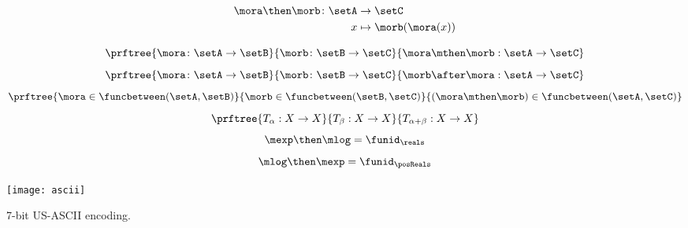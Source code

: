 {\begin{forslides}
        
        \begin{equation}
            \label{eq:funcomposition}
            \begin{aligned}
                \mora \then \morb \colon \setA & \to  \setC \\
                x & \mapsto \morb(\mora(x))
            \end{aligned}
        \end{equation}
        
        \begin{equation}
            \label{eq:funccomp1}
            \prftree{\mora \colon \setA \to \setB}{\morb \colon \setB \to \setC}{\mora \mthen \morb : \setA \to \setC}
        \end{equation}
        \begin{equation}
            \label{eq:funccomp2}
            \prftree{\mora \colon \setA \to \setB}{\morb \colon \setB \to \setC}{\morb \after \mora : \setA \to \setC}
        \end{equation}
        \begin{equation}
            \label{eq:funccomp3}
            \prftree{%
                \mora \in \funcbetween(\setA, \setB)}{%
                \morb \in \funcbetween( \setB, \setC)}{
                (\mora \mthen \morb) \in \funcbetween( \setA, \setC)}
        \end{equation}
        \begin{equation}
            \label{eq:transitions}
            \prftree{T_\alpha: X \to X }{T_\beta : X \to X}{T_{\alpha+\beta} : X \to X}
        \end{equation}
        \begin{equation}
            \label{eq:explogid}
            \mexp \then \mlog = \funid_{\reals}
        \end{equation}
        \begin{equation}
            \label{eq:logexpid}
            \mlog \then \mexp = \funid_{\posReals}
        \end{equation}
    \end{forslides}
}%

\begin{marginfigure}
    \texttt{[image: ascii]}
    \caption{7-bit US-ASCII encoding. \label{fig:asciifigure}}
\end{marginfigure}


